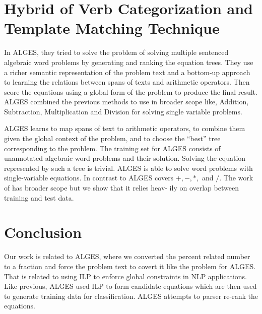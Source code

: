 \documentclass[document.tex]{subfiles}
\begin{document}
\section{Hybrid of Verb Categorization and Template Matching Technique}
\noindent In ALGES\cite{3}, they tried to solve the problem of solving multiple sentenced algebraic word problems by generating and ranking the equation trees. They use a richer semantic representation of the problem text and a bottom-up approach to learning the relations between spans of texts and arithmetic operators. Then score the equations using a global form of the problem to produce the final result. ALGES combined the previous methods to use in broader scope like, Addition, Subtraction, Multiplication and Division for solving single variable problems.

ALGES learns to map spans of text to arithmetic operators, to combine them given the global context of the problem, and to
choose the “best” tree corresponding to the problem.
The training set for ALGES consists of unannotated
algebraic word problems and their solution. Solving the equation represented by such a tree is trivial.
ALGES is able to solve word problems with single-variable equations.
In contrast to \cite{1} ALGES covers $ +, -, *, $ and $/$. The work of \cite{2} has broader scope but we show that it relies heav-
ily on overlap between training and test data.
\section{Conclusion}
\noindent Our work is related to ALGES, where we converted the percent related number to a fraction and force the problem text to covert it like the problem for ALGES. That is related to using ILP to enforce global constraints in NLP applications\cite{24}. Like previous\cite{25, 26, 27, 28}, ALGES used ILP to form candidate equations which are then used to generate training data for classification. ALGES attempts to parser re-rank the equations\cite{29, 30}.
\end{document}
